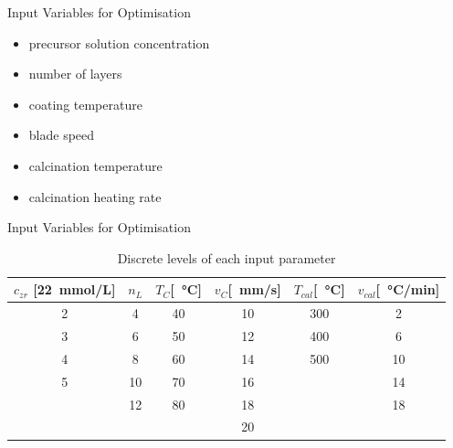 \documentclass[hyperref={pdfpagelabels=false}, aspectratio=43, t]{beamer}  %
\begin{document}
\begin{frame}{Input Variables for Optimisation}
	\begin{itemize}
		\item precursor solution concentration
		\item number of layers 
		\item coating temperature
		\item blade speed
		\item calcination temperature
		\item calcination heating rate
	\end{itemize}
\end{frame}

\begin{frame}{Input Variables for Optimisation}
\begin{table}[htb]
	\centering
	\begin{tabular}{cc cc cc}
		\hline\hline
		$c_{zr}$ [22\SI{}{\milli\mol/\liter}]	&$n_L$	&$T_{C}$[\SI{}{\degreeCelsius}]	&$v_{C}$[\SI{}{\milli\meter/\second}]	&$T_{cal}$[\SI{}{\degreeCelsius}]	&$v_{cal}$[\SI{}{\degreeCelsius/\minute}]	\\
		\hline
		2				&4		&40					&10				&300				&2	\\
		3				&6		&50					&12				&400				&6	\\
		4				&8		&60					&14				&500				&10	\\
		5				&10		&70					&16				&					&14	\\
						&12		&80					&18				&					&18	\\
						&		&					&20				&					& \\
		\hline\hline
	\end{tabular}
	\caption{Discrete levels of each input parameter }
	\label{tab:input}
\end{table}
\end{frame}
\end{document}
